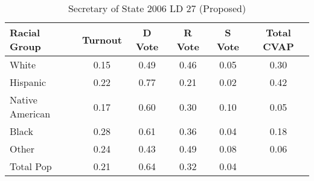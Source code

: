 \begin{table}[htb]
\begin{center}
\caption{Secretary of State 2006 LD 27 (Proposed)}
\label{sos06_cvap_ld_27}
\begin{tabular}{lccccc}
  \hline
Racial Group & Turnout & D Vote & R Vote & S Vote & Total CVAP \\ 
  \hline
White & 0.15 & 0.49 & 0.46 & 0.05 & 0.30 \\ 
  Hispanic & 0.22 & 0.77 & 0.21 & 0.02 & 0.42 \\ 
  Native American & 0.17 & 0.60 & 0.30 & 0.10 & 0.05 \\ 
  Black & 0.28 & 0.61 & 0.36 & 0.04 & 0.18 \\ 
  Other & 0.24 & 0.43 & 0.49 & 0.08 & 0.06 \\ 
  Total Pop & 0.21 & 0.64 & 0.32 & 0.04 &  \\ 
   \hline
\end{tabular}
\end{center}
\end{table}
